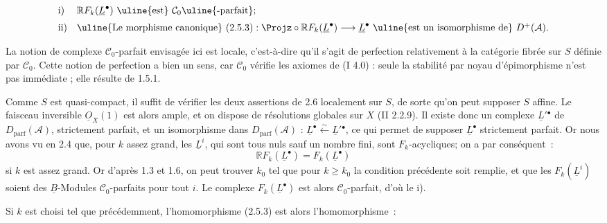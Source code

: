 
\[
\begin{array}{ll}
\mathrm{i)}& \mathbb R F_k(\underline{L}^{\bullet})\text{ \uline{est} }\mathcal C_0
\text{\uline{-parfait}};\\[2mm]
\mathrm{ii)}& \text{\uline{Le morphisme canonique} }(2.5.3):
\Projz\circ\mathbb R F_k(\underline{L}^{\bullet})\longrightarrow \underline{L}^{\bullet}
\text{ \uline{est un isomorphisme de} }D^+(\mathcal A).
\end{array}
\]

La notion de complexe $\mathcal C_0$-parfait envisagée ici est locale, c'est-à-dire qu'il s'agit de perfection relativement à la catégorie fibrée sur $S$ définie par $\mathcal C_0$. Cette notion de perfection a bien un sens, car $\mathcal C_0$ vérifie les axiomes de (I 4.0) : seule la stabilité par noyau d'épimorphisme n'est pas immédiate ; elle résulte de 1.5.1.

Comme $S$ est quasi-compact, il suffit de vérifier les deux assertions de 2.6 localement sur $S$, de sorte qu'on peut supposer $S$ affine. Le faisceau inversible $\underline{O}_X(1)$ est alors ample, et on dispose de résolutions globales sur $X$ (II 2.2.9). Il existe donc un complexe $\underline{L}'{}^{\bullet}$ de $D_{\mathrm{parf}}(\mathcal A)$, strictement parfait, et un isomorphisme dans $D_{\mathrm{parf}}(\mathcal A)$ : $\underline{L}^{\bullet}\xleftarrow{\sim}\underline{L}'{}^{\bullet}$, ce qui permet de supposer $\underline{L}^{\bullet}$ strictement parfait. Or nous avons vu en 2.4 que, pour $k$ assez grand, les $\underline{L}^i$, qui sont tous nuls sauf un nombre fini, sont $F_k$-acycliques; on a par conséquent~:
\[
  \mathbb R F_k(\underline{L}^{\bullet})=F_k(\underline{L}^{\bullet})
\]
si $k$ est assez grand. Or d'après 1.3 et 1.6, on peut trouver $k_0$ tel que pour $k\geq k_0$ la condition précédente soit remplie, et que les $F_k(\underline{L}^i)$ soient des $\underline{B}$-Modules $\mathcal C_0$-parfaits pour tout $i$. Le complexe $F_k(\underline{L}^{\bullet})$ est alors $\mathcal C_0$-parfait, d'où le i).

Si $k$ est choisi tel que précédemment, l'homomorphisme (2.5.3) est alors l'homomorphisme~:
